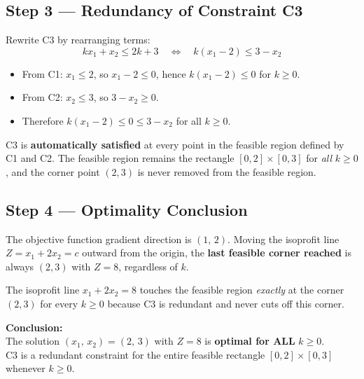 \documentclass[12pt]{article}
\begin{document}
\subsection*{Step 3 --- Redundancy of Constraint C3}

Rewrite C3 by rearranging terms:
\[
  kx_1 + x_2 \leq 2k + 3
  \quad\Longleftrightarrow\quad
  k(x_1 - 2) \leq 3 - x_2
\]

\begin{itemize}[noitemsep, topsep=4pt]
  \item From C1: $x_1 \leq 2$, so $x_1 - 2 \leq 0$, hence $k(x_1-2) \leq 0$ for $k \geq 0$.
  \item From C2: $x_2 \leq 3$, so $3 - x_2 \geq 0$.
  \item Therefore $k(x_1-2) \leq 0 \leq 3 - x_2$ \quad for all $k \geq 0$.
\end{itemize}

\begin{conceptbox}
C3 is \textbf{automatically satisfied} at every point in the feasible region defined by C1 and C2.
The feasible region remains the rectangle $[0,2]\times[0,3]$ for \emph{all} $k \geq 0$,
and the corner point $(2,3)$ is never removed from the feasible region.
\end{conceptbox}

\subsection*{Step 4 --- Optimality Conclusion}

The objective function gradient direction is $(1,\,2)$.  Moving the isoprofit line
$Z = x_1 + 2x_2 = c$ outward from the origin, the \textbf{last feasible corner reached}
is always $(2,3)$ with $Z = 8$, regardless of $k$.

The isoprofit line $x_1 + 2x_2 = 8$ touches the feasible region \emph{exactly} at the corner
$(2,3)$ for every $k \geq 0$ because C3 is redundant and never cuts off this corner.

\begin{formulabox}
\textbf{Conclusion:}\\[4pt]
The solution $(x_1,\, x_2) = (2,\, 3)$ with $Z = 8$ is \textbf{optimal for ALL} $k \geq 0$.\\[4pt]
C3 is a redundant constraint for the entire feasible rectangle $[0,2]\times[0,3]$ whenever $k \geq 0$.
\end{formulabox}

\newpage

\end{document}
